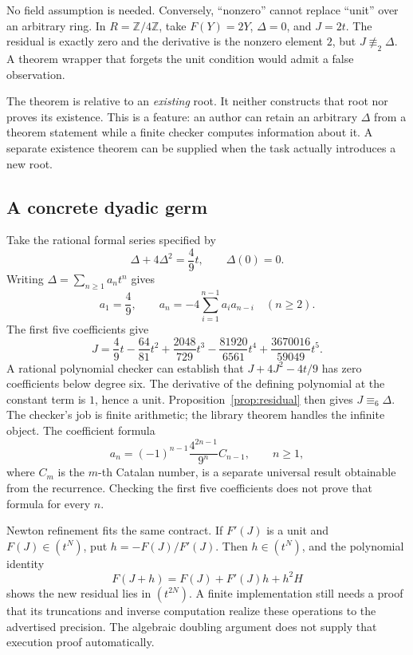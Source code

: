 \documentclass[11pt,letterpaper]{article}
\newcommand{\Z}{\mathbb Z}
\begin{document}
No field assumption is needed. Conversely, ``nonzero'' cannot replace ``unit''
over an arbitrary ring. In \(R=\Z/4\Z\), take \(F(Y)=2Y\), \(\Delta=0\),
and \(J=2t\). The residual is exactly zero and the derivative is the nonzero
element \(2\), but \(J\not\equiv_2\Delta\). A theorem wrapper that forgets
the unit condition would admit a false observation.

The theorem is relative to an \emph{existing} root. It neither constructs that
root nor proves its existence. This is a feature: an author can retain an
arbitrary \(\Delta\) from a theorem statement while a finite checker computes
information about it. A separate existence theorem can be supplied when the
task actually introduces a new root.

\subsection{A concrete dyadic germ}
Take the rational formal series specified by
\[
 \Delta+4\Delta^2=\frac49t,\qquad \Delta(0)=0.
\]
Writing \(\Delta=\sum_{n\ge1}a_nt^n\) gives
\[
 a_1=\frac49,\qquad
 a_n=-4\sum_{i=1}^{n-1}a_i a_{n-i}\quad(n\ge2).
\]
The first five coefficients give
\[
 J=\frac49t-\frac{64}{81}t^2+\frac{2048}{729}t^3
       -\frac{81920}{6561}t^4+\frac{3670016}{59049}t^5.
\]
A rational polynomial checker can establish that
\(J+4J^2-4t/9\) has zero coefficients below degree six. The derivative of the
defining polynomial at the constant term is \(1\), hence a unit.
Proposition~\ref{prop:residual} then gives \(J\equiv_6\Delta\). The checker's
job is finite arithmetic; the library theorem handles the infinite object.
The coefficient formula
\[
 a_n=(-1)^{n-1}\frac{4^{2n-1}}{9^n}C_{n-1},\qquad n\ge1,
\]
where \(C_m\) is the \(m\)-th Catalan number, is a separate universal result
obtainable from the recurrence. Checking the first five coefficients does not
prove that formula for every \(n\).

Newton refinement fits the same contract. If \(F'(J)\) is a unit and
\(F(J)\in(t^N)\), put \(h=-F(J)/F'(J)\). Then \(h\in(t^N)\), and the
polynomial identity
\[
 F(J+h)=F(J)+F'(J)h+h^2H
\]
shows the new residual lies in \((t^{2N})\). A finite implementation still
needs a proof that its truncations and inverse computation realize these
operations to the advertised precision. The algebraic doubling argument does
not supply that execution proof automatically.
\end{document}
